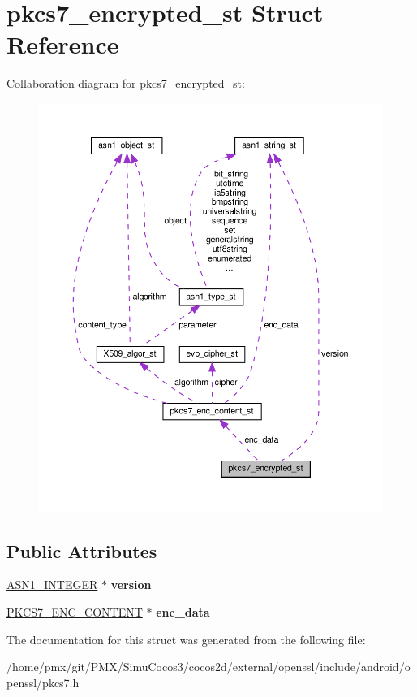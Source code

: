\hypertarget{structpkcs7__encrypted__st}{}\section{pkcs7\+\_\+encrypted\+\_\+st Struct Reference}
\label{structpkcs7__encrypted__st}


Collaboration diagram for pkcs7\+\_\+encrypted\+\_\+st\+:
\nopagebreak
\begin{figure}[H]
\begin{center}
\leavevmode
\includegraphics[width=350pt]{structpkcs7__encrypted__st__coll__graph}
\end{center}
\end{figure}
\subsection*{Public Attributes}
\begin{DoxyCompactItemize}
\item 
\mbox{\label{structpkcs7__encrypted__st_af2549cbc62c57f199dbbeeea0bc03757}} 
\hyperlink{structasn1__string__st}{A\+S\+N1\+\_\+\+I\+N\+T\+E\+G\+ER} $\ast$ {\bfseries version}
\item 
\mbox{\label{structpkcs7__encrypted__st_a913629528bdd93e85e8675ae62d32820}} 
\hyperlink{structpkcs7__enc__content__st}{P\+K\+C\+S7\+\_\+\+E\+N\+C\+\_\+\+C\+O\+N\+T\+E\+NT} $\ast$ {\bfseries enc\+\_\+data}
\end{DoxyCompactItemize}


The documentation for this struct was generated from the following file\+:\begin{DoxyCompactItemize}
\item 
/home/pmx/git/\+P\+M\+X/\+Simu\+Cocos3/cocos2d/external/openssl/include/android/openssl/pkcs7.\+h\end{DoxyCompactItemize}

